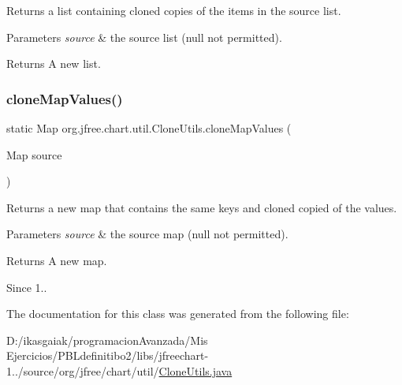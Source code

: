 Returns a list containing cloned copies of the items in the source list.


\begin{DoxyParams}{Parameters}
{\em source} & the source list ({\ttfamily null} not permitted).\\
\hline
\end{DoxyParams}
\begin{DoxyReturn}{Returns}
A new list. 
\end{DoxyReturn}
\mbox{\label{classorg_1_1jfree_1_1chart_1_1util_1_1_clone_utils_a7a96fe6f0ac75477bf11f518825a7f2b}} 
\subsubsection{\texorpdfstring{clone\+Map\+Values()}{cloneMapValues()}}
{\footnotesize\ttfamily static Map org.\+jfree.\+chart.\+util.\+Clone\+Utils.\+clone\+Map\+Values (\begin{DoxyParamCaption}\item[{Map}]{source }\end{DoxyParamCaption})\hspace{0.3cm}{\ttfamily [static]}}

Returns a new map that contains the same keys and cloned copied of the values.


\begin{DoxyParams}{Parameters}
{\em source} & the source map ({\ttfamily null} not permitted).\\
\hline
\end{DoxyParams}
\begin{DoxyReturn}{Returns}
A new map.
\end{DoxyReturn}
\begin{DoxySince}{Since}
1.. 
\end{DoxySince}


The documentation for this class was generated from the following file\+:\begin{DoxyCompactItemize}
\item 
D\+:/ikasgaiak/programacion\+Avanzada/\+Mis Ejercicios/\+P\+B\+Ldefinitibo2/libs/jfreechart-\/1../source/org/jfree/chart/util/\mbox{\hyperlink{_clone_utils_8java}{Clone\+Utils.\+java}}\end{DoxyCompactItemize}
